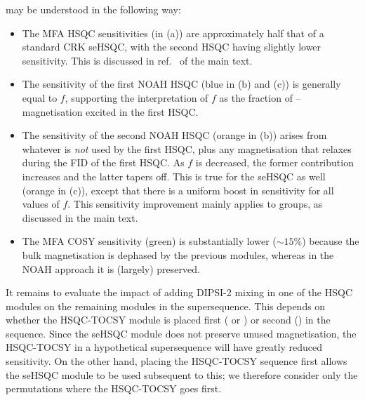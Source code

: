  may be understood in the following way:

\begin{itemize}
    \item The MFA HSQC sensitivities (in (a)) are approximately half that of a standard CRK seHSQC, with the second HSQC having slightly lower sensitivity.
        This is discussed in ref.\  of the main text.
    \item The sensitivity of the first NOAH HSQC (blue in (b) and (c)) is generally equal to $f$, supporting the interpretation of $f$ as the fraction of \carbon{}--\proton{} magnetisation excited in the first HSQC.
    \item The sensitivity of the second NOAH HSQC (orange in (b)) arises from whatever is \textit{not} used by the first HSQC, plus any magnetisation that relaxes during the FID of the first HSQC.
        As $f$ is decreased, the former contribution increases and the latter tapers off.
        This is true for the seHSQC as well (orange in (c)), except that there is a uniform boost in sensitivity for all values of $f$.
        This sensitivity improvement mainly applies to  groups, as discussed in the main text.
    \item The MFA COSY sensitivity (green) is substantially lower ($\sim 15\%$) because the bulk magnetisation is dephased by the previous modules, whereas in the NOAH approach it is (largely) preserved.
\end{itemize}

It remains to evaluate the impact of adding DIPSI-2 mixing in one of the HSQC modules on the remaining modules in the supersequence.
This depends on whether the HSQC-TOCSY module is placed first ( or ) or second () in the sequence.
Since the seHSQC module does not preserve unused  magnetisation, the HSQC-TOCSY in a hypothetical  supersequence will have greatly reduced sensitivity.
On the other hand, placing the HSQC-TOCSY sequence first allows the seHSQC module to be used subsequent to this; we therefore consider only the permutations where the HSQC-TOCSY goes first.

